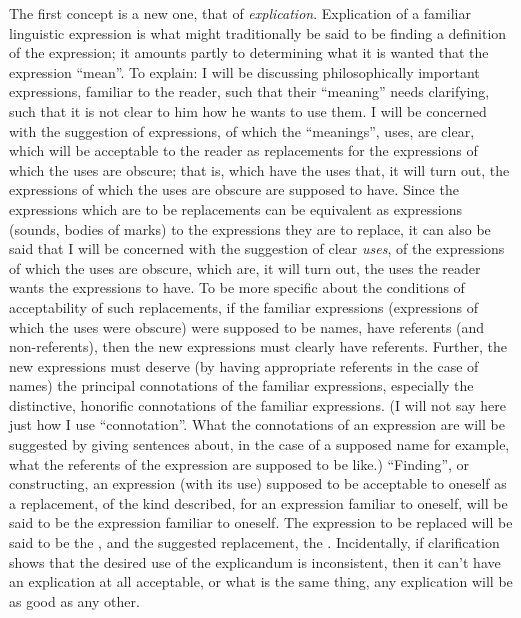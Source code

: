 The first concept is a new one, that of \emph{explication}. Explication of a 
familiar linguistic expression is what might traditionally be said to be finding 
a definition of the expression; it amounts partly to determining what it is 
wanted that the expression \enquote{mean}. To explain: I will be discussing 
philosophically important expressions, familiar to the reader, such that their 
\enquote{meaning} needs clarifying, such that it is not clear to him how he wants to 
use them. I will be concerned with the suggestion of expressions, of which 
the \enquote{meanings}, uses, are clear, which will be acceptable to the reader as 
replacements for the expressions of which the uses are obscure; that is, 
which have the uses that, it will turn out, the expressions of which the uses 
are obscure are supposed to have. Since the expressions which are to be 
replacements can be equivalent as expressions (sounds, bodies of marks) to 
the expressions they are to replace, it can also be said that I will be 
concerned with the suggestion of clear \emph{uses}, of the expressions of which the 
uses are obscure, which are, it will turn out, the uses the reader wants the 
expressions to have. To be more specific about the conditions of 
acceptability of such replacements, if the familiar expressions (expressions of 
which the uses were obscure) were supposed to be names, have referents 
(and non-referents), then the new expressions must clearly have referents. 
Further, the new expressions must deserve (by having appropriate referents 
in the case of names) the principal connotations of the familiar expressions, 
especially the distinctive, honorific connotations of the familiar expressions. 
(I will not say here just how I use \enquote{connotation}. What the connotations of 
an expression are will be suggested by giving sentences about, in the case of a 
supposed name for example, what the referents of the expression are 
supposed to be like.) \enquote{Finding}, or constructing, an expression (with its use) 
supposed to be acceptable to oneself as a replacement, of the kind described, 
for an expression familiar to oneself, will be said to be  the 
expression familiar to oneself. The expression to be replaced will be said to 
be the , and the suggested replacement, the . 
Incidentally, if clarification shows that the desired use of the explicandum is 
inconsistent, then it can't have an explication at all acceptable, or what is the 
same thing, any explication will be as good as any other. 

